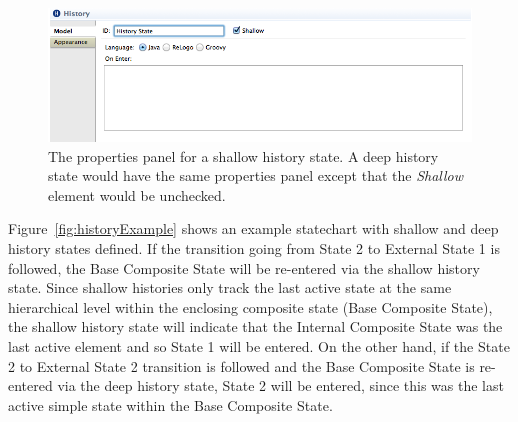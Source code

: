 \documentclass[11pt]{amsart}
\begin{document}
\begin{figure}
\begin{center}
\vspace{.2in}
\centerline {
\includegraphics[width=5in]{StatechartsImages/HistoryProperties.png}
}
\caption{The properties panel for a shallow history state. A deep history state would have the same properties panel except that the \emph{Shallow} element would be unchecked.}
\label{fig:historyProperties}
\end{center}
\end{figure}

Figure~\ref{fig:historyExample} shows an example statechart with shallow and deep history states defined. If the transition going from State 2 to External State 1 is followed, the Base Composite State will be re-entered via the shallow history state. Since shallow histories only track the last active state at the same hierarchical level within the enclosing composite state (Base Composite State), the shallow history state will indicate that the Internal Composite State was the last active element and so State 1 will be entered. On the other hand, if the State 2 to External State 2 transition is followed and the Base Composite State is re-entered via the deep history state, State 2 will be entered, since this was the last active simple state within the Base Composite State.
\end{document}
